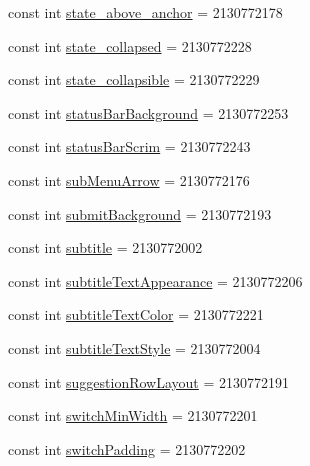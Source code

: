 \begin{CompactItemize}
\item 
const int \hyperlink{class__2doo_1_1_droid_1_1_resource_1_1_attribute_c3a6ecef344690a03858a122656e8b70}{state\_\-above\_\-anchor} = 2130772178
\item 
const int \hyperlink{class__2doo_1_1_droid_1_1_resource_1_1_attribute_5971e4c2e038211ca9dcc75316b375aa}{state\_\-collapsed} = 2130772228
\item 
const int \hyperlink{class__2doo_1_1_droid_1_1_resource_1_1_attribute_e1c861d41e884c9afbb64c3890e248aa}{state\_\-collapsible} = 2130772229
\item 
const int \hyperlink{class__2doo_1_1_droid_1_1_resource_1_1_attribute_a3faa76cf1df2319dca665758031f3d0}{statusBarBackground} = 2130772253
\item 
const int \hyperlink{class__2doo_1_1_droid_1_1_resource_1_1_attribute_3077f094a7dd990f14c3aa0951e51731}{statusBarScrim} = 2130772243
\item 
const int \hyperlink{class__2doo_1_1_droid_1_1_resource_1_1_attribute_d3e227ba01b0f2deee3a940ab51f91c5}{subMenuArrow} = 2130772176
\item 
const int \hyperlink{class__2doo_1_1_droid_1_1_resource_1_1_attribute_f072450a6ffc7271e7f63196d28c586a}{submitBackground} = 2130772193
\item 
const int \hyperlink{class__2doo_1_1_droid_1_1_resource_1_1_attribute_5c8c943059230be51e95eca23ed82aa8}{subtitle} = 2130772002
\item 
const int \hyperlink{class__2doo_1_1_droid_1_1_resource_1_1_attribute_86a039cca505c088094fc1857c9f6243}{subtitleTextAppearance} = 2130772206
\item 
const int \hyperlink{class__2doo_1_1_droid_1_1_resource_1_1_attribute_23eb7a248e16c6863fcc9bbee7021ad8}{subtitleTextColor} = 2130772221
\item 
const int \hyperlink{class__2doo_1_1_droid_1_1_resource_1_1_attribute_c164209a303cf19a66ff5cd0e8243200}{subtitleTextStyle} = 2130772004
\item 
const int \hyperlink{class__2doo_1_1_droid_1_1_resource_1_1_attribute_6c9b3f8e6bf978924fa6036c19fad631}{suggestionRowLayout} = 2130772191
\item 
const int \hyperlink{class__2doo_1_1_droid_1_1_resource_1_1_attribute_c2952afd6bc9250adc3de827b83fd7f8}{switchMinWidth} = 2130772201
\item 
const int \hyperlink{class__2doo_1_1_droid_1_1_resource_1_1_attribute_4e127d6a82e090fe6ad55e47984be26f}{switchPadding} = 2130772202
\item 

\end{CompactItemize}
